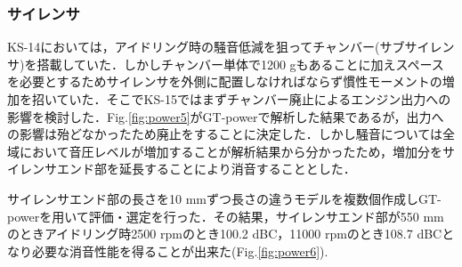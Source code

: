 \subsubsection{サイレンサ}
KS-14においては，アイドリング時の騒音低減を狙ってチャンバー(サブサイレンサ)を搭載していた．しかしチャンバー単体で1200 gもあることに加えスペースを必要とするためサイレンサを外側に配置しなければならず慣性モーメントの増加を招いていた．そこでKS-15ではまずチャンバー廃止によるエンジン出力への影響を検討した．Fig.\ref{fig:power5}がGT-powerで解析した結果であるが，出力への影響は殆どなかったため廃止をすることに決定した．しかし騒音については全域において音圧レベルが増加することが解析結果から分かったため，増加分をサイレンサエンド部を延長することにより消音することとした．

サイレンサエンド部の長さを10 mmずつ長さの違うモデルを複数個作成しGT-powerを用いて評価・選定を行った．その結果，サイレンサエンド部が550 mmのときアイドリング時2500 rpmのとき100.2 dBC，11000 rpmのとき108.7 dBCとなり必要な消音性能を得ることが出来た(Fig.\ref{fig:power6}).
